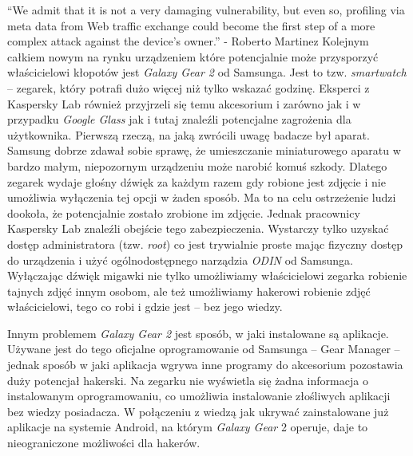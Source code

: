\documentclass[brudnopis]{xmgr}
\begin{document}
“We admit that it is not a very damaging vulnerability, but even so, profiling via meta data from Web traffic exchange could become the first step of a more complex attack against the device’s owner.” - Roberto Martinez
Kolejnym całkiem nowym na rynku urządzeniem które potencjalnie może przysporzyć właścicielowi kłopotów jest \emph{Galaxy Gear 2} od Samsunga. Jest to tzw. \emph{smartwatch} – zegarek, który potrafi dużo więcej niż tylko wskazać godzinę. Eksperci z Kaspersky Lab również przyjrzeli się temu akcesorium i zarówno jak i w przypadku \emph{Google Glass} jak i tutaj znaleźli potencjalne zagrożenia dla użytkownika. Pierwszą rzeczą, na jaką zwrócili uwagę badacze był aparat. Samsung dobrze zdawał sobie sprawę, że umieszczanie miniaturowego aparatu w bardzo małym, niepozornym urządzeniu może narobić komuś szkody. Dlatego zegarek wydaje głośny dźwięk za każdym razem gdy robione jest zdjęcie i nie umożliwia wyłączenia tej opcji w żaden sposób. Ma to na celu ostrzeżenie ludzi dookoła, że potencjalnie zostało zrobione im zdjęcie. Jednak pracownicy Kaspersky Lab znaleźli obejście tego zabezpieczenia. Wystarczy tylko uzyskać dostęp administratora (tzw. \emph{root}) co jest trywialnie proste mając fizyczny dostęp do urządzenia i użyć ogólnodostępnego narządzia \emph{ODIN} od Samsunga. Wyłączając dźwięk migawki nie tylko umożliwiamy właścicielowi zegarka robienie tajnych zdjęć innym osobom, ale też umożliwiamy hakerowi robienie zdjęć właścicielowi, tego co robi i gdzie jest – bez jego wiedzy.

Innym problemem \emph{Galaxy Gear 2} jest sposób, w jaki instalowane są aplikacje. Używane jest do tego oficjalne oprogramowanie od Samsunga – Gear Manager – jednak sposób w jaki aplikacja wgrywa inne programy do akcesorium pozostawia duży potencjał hakerski. Na zegarku nie wyświetla się żadna informacja o instalowanym oprogramowaniu, co umożliwia instalowanie złośliwych aplikacji bez wiedzy posiadacza. W połączeniu z wiedzą jak ukrywać zainstalowane już aplikacje na systemie Android, na którym \emph{Galaxy Gear} 2 operuje, daje to nieograniczone możliwości dla hakerów.
\end{document}
